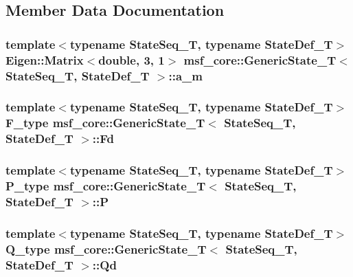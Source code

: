 \subsection{Member Data Documentation}
\hypertarget{structmsf__core_1_1GenericState__T_af0fa8d13ba3aa3ff0253d85bb79d6a48}{
\subsubsection[{a\-\_\-m}]{\setlength{\rightskip}{0pt plus 5cm}template$<$typename State\-Seq\-\_\-\-T, typename State\-Def\-\_\-\-T$>$ Eigen\-::\-Matrix$<$double, 3, 1$>$ {\bf msf\-\_\-core\-::\-Generic\-State\-\_\-\-T}$<$ State\-Seq\-\_\-\-T, State\-Def\-\_\-\-T $>$\-::a\-\_\-m}}\label{structmsf__core_1_1GenericState__T_af0fa8d13ba3aa3ff0253d85bb79d6a48}
\hypertarget{structmsf__core_1_1GenericState__T_ad280aac57eb229c02d49172645159b60}{
\subsubsection[{Fd}]{\setlength{\rightskip}{0pt plus 5cm}template$<$typename State\-Seq\-\_\-\-T, typename State\-Def\-\_\-\-T$>$ {\bf F\-\_\-type} {\bf msf\-\_\-core\-::\-Generic\-State\-\_\-\-T}$<$ State\-Seq\-\_\-\-T, State\-Def\-\_\-\-T $>$\-::Fd}}\label{structmsf__core_1_1GenericState__T_ad280aac57eb229c02d49172645159b60}
\hypertarget{structmsf__core_1_1GenericState__T_adbfa25972a10054e2c310e5c74883427}{
\subsubsection[{P}]{\setlength{\rightskip}{0pt plus 5cm}template$<$typename State\-Seq\-\_\-\-T, typename State\-Def\-\_\-\-T$>$ {\bf P\-\_\-type} {\bf msf\-\_\-core\-::\-Generic\-State\-\_\-\-T}$<$ State\-Seq\-\_\-\-T, State\-Def\-\_\-\-T $>$\-::P}}\label{structmsf__core_1_1GenericState__T_adbfa25972a10054e2c310e5c74883427}
\hypertarget{structmsf__core_1_1GenericState__T_a68fa9e618784839b121ebbf2bbb42040}{
\subsubsection[{Qd}]{\setlength{\rightskip}{0pt plus 5cm}template$<$typename State\-Seq\-\_\-\-T, typename State\-Def\-\_\-\-T$>$ {\bf Q\-\_\-type} {\bf msf\-\_\-core\-::\-Generic\-State\-\_\-\-T}$<$ State\-Seq\-\_\-\-T, State\-Def\-\_\-\-T $>$\-::Qd}}\label{structmsf__core_1_1GenericState__T_a68fa9e618784839b121ebbf2bbb42040}
